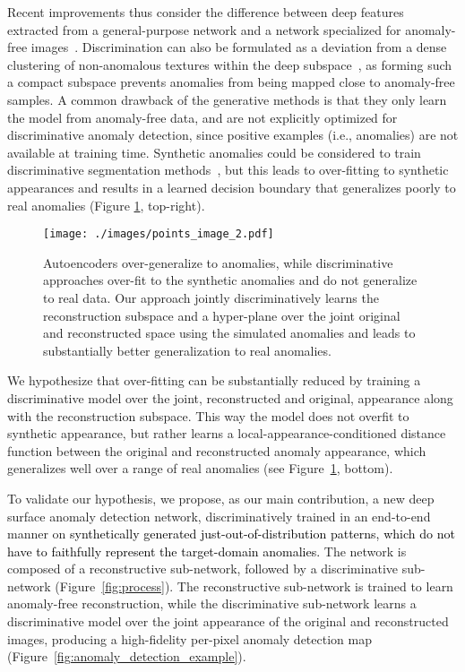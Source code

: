 \documentclass[10pt,twocolumn,letterpaper]{article}
\newcommand\ntext[1]{\textcolor{black}{#1}}
\begin{document}
Recent improvements thus consider the difference between deep features extracted from a general-purpose network and a network specialized for anomaly-free images~\cite{bergmann2020uninformed}. Discrimination can also be formulated as a deviation from a dense clustering of non-anomalous textures within the deep subspace~\cite{pmlr-v80-ruff18a,chalapathy2018anomaly}, as forming such a compact subspace prevents anomalies from being mapped close to anomaly-free samples.
A common drawback of the generative methods is that they only learn the model from anomaly-free data, and are not explicitly optimized for discriminative anomaly detection, since positive examples (i.e., anomalies) are not available at training time. Synthetic anomalies could be considered to train discriminative segmentation methods~\cite{chen2017rethinking,ronneberger2015unet}, but this leads to over-fitting to synthetic appearances and results in a learned decision boundary that generalizes poorly to real anomalies (Figure \ref{fig:point_examples}, top-right).

\begin{figure}
\centering
  \texttt{[image: ./images/points\_image\_2.pdf]}
\caption{Autoencoders over-generalize to anomalies, while discriminative approaches over-fit to the synthetic anomalies and do not generalize to real data. Our approach jointly discriminatively learns the reconstruction subspace and a hyper-plane over the joint original and reconstructed space using the simulated anomalies and leads to substantially better generalization to real anomalies.
}
\label{fig:point_examples}
\end{figure}



We hypothesize that over-fitting can be substantially reduced by training a discriminative model over the joint, reconstructed and original, appearance along with the reconstruction subspace. This way the model does not overfit to synthetic appearance, but rather learns a local-appearance-conditioned distance function between the original and reconstructed anomaly appearance, which generalizes well over a range of real anomalies (see Figure~\ref{fig:point_examples}, bottom).

To validate our hypothesis, we propose, as our main contribution, a new deep surface anomaly detection network, discriminatively trained in an end-to-end manner on \ntext{synthetically generated just-out-of-distribution patterns, which do not have to faithfully represent the target-domain anomalies.}
The network is composed of a reconstructive sub-network, followed by a discriminative sub-network (Figure~\ref{fig:process}). The reconstructive sub-network is trained to learn anomaly-free reconstruction, while the discriminative sub-network learns a discriminative model over the joint appearance of the original and reconstructed images, producing a high-fidelity per-pixel anomaly detection map (Figure~\ref{fig:anomaly_detection_example}). 
\end{document}
